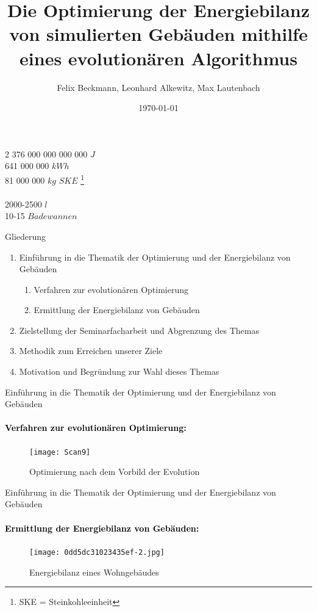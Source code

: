 \documentclass[11pt]{beamer}
\author{Felix Beckmann, Leonhard Alkewitz, Max Lautenbach}
\title{Die Optimierung der Energiebilanz von simulierten Gebäuden mithilfe eines evolutionären Algorithmus}
\institute{Spezialschulteil des Albert-Schweizer Gymnasium Erfurt}
\date{\today}
\begin{document}
\begin{frame}

\end{frame}

\begin{frame}
\begin{center}
\huge{2 376 000 000 000 000 $J$}  \\  
\pause \huge{641 000 000 $kWh$} \\ 
\pause \huge{81 000 000 $kg$ $SKE$ \footnote{SKE = Steinkohleeinheit}} \\ 
\hrulefill{}  \\
\pause \huge{2000-2500 $l$} \\ 
\pause \huge{10-15 $Badewannen$}
\end{center}
\end{frame}

\begin{frame}
\titlepage
\end{frame}

\begin{frame}{Gliederung}
\begin{enumerate}
\item{Einführung in die Thematik der Optimierung und der Energiebilanz von Gebäuden}
\begin{enumerate}
\item{Verfahren zur evolutionären Optimierung}
\item{Ermittlung der Energiebilanz von Gebäuden}
\end{enumerate}
\item{Zielstellung der Seminarfacharbeit und Abgrenzung des Themas}
\item{Methodik zum Erreichen unserer Ziele}
\item{Motivation und Begründung zur Wahl dieses Themas}
\end{enumerate}
\end{frame}

\begin{frame}{Einführung in die Thematik der Optimierung und der Energiebilanz von Gebäuden}
\framesubtitle{\large{\textcolor{black}{Verfahren zur evolutionären Optimierung:}}}
\begin{figure}
\texttt{[image: Scan9]}
\caption{Optimierung nach dem Vorbild der Evolution}
\end{figure}
\end{frame}

\begin{frame}{Einführung in die Thematik der Optimierung und der Energiebilanz von Gebäuden}
\framesubtitle{\large{\textcolor{black}{Ermittlung der Energiebilanz von Gebäuden:}}}
\begin{figure}
\texttt{[image: 0dd5dc31023435ef-2.jpg]} 
\caption{Energiebilanz eines Wohngebäudes}
\end{figure}
\end{frame}
\end{document}
